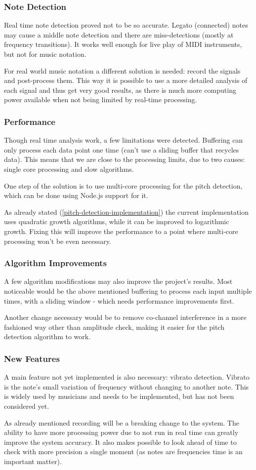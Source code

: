 \subsubsection{Note Detection}
Real time note detection proved not to be so accurate. Legato (connected) notes
may cause a middle note detection and there are miss-detections (mostly at frequency
transitions). It works well enough for live play of MIDI instruments, but not
for music notation. 

For real world music notation a different solution is needed: record the signals
and post-process them. This way it is possible to use a more detailed analysis
of each signal and thus get very good results, as there is much more computing
power available when not being limited by real-time processing.

\subsubsection{Performance}
Though real time analysis work, a few limitations were detected. Buffering can only
process each data point one time (can't use a sliding buffer that recycles data).
This means that we are close to the processing limits, due to two causes: single
core processing and slow algorithms. 

One step of the solution is to use multi-core processing for the pitch detection,
which can be done using Node.js support for it. 

As already stated (\autoref{pitch-detection-implementation}) the current implementation
uses quadratic growth algorithms, while it can be improved to logarithmic
growth. Fixing this will improve the performance to a point where multi-core processing
won't be even necessary.

\subsubsection{Algorithm Improvements}
A few algorithm modifications may also improve the project's results. Most noticeable
would be the above mentioned buffering to process each input multiple times, with a
sliding window - which needs performance improvements first.

Another change necessary would be to remove co-channel interference in a more fashioned
way other than amplitude check, making it easier for the pitch detection algorithm to work.

\subsubsection{New Features}
A main feature not yet implemented is also necessary: vibrato detection. Vibrato is the
note's small variation of frequency without changing to another note. This is widely used
by musicians and needs to be implemented, but has not been considered yet.

As already mentioned recording will be a breaking change to the system. The ability to have
more processing power due to not run in real time can greatly improve the system accuracy.
It also makes possible to look ahead of time to check with more precision a single moment
(as notes are frequencies time is an important matter).
